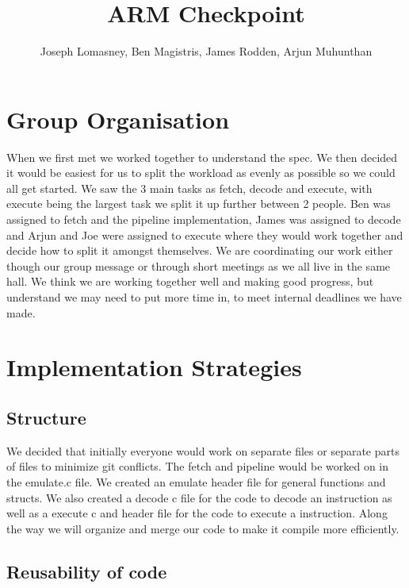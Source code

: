 \documentclass[11pt]{article}
\begin{document}
\title{ARM Checkpoint}
\author{Joseph Lomasney, Ben Magistris, James Rodden, Arjun Muhunthan}

\maketitle

\section{Group Organisation}

When we first met we worked together to understand the spec. We then decided it would be easiest for us to split the workload as evenly as possible so we could all get started. We saw the 3 main tasks as fetch, decode and execute, with execute being the largest task we split it up further between 2 people. Ben was assigned to fetch and the pipeline implementation, James was assigned to decode and Arjun and Joe were assigned to execute where they would work together and decide how to split it amongst themselves. We are coordinating our work either though our group message or through short meetings as we all live in the same hall. We think we are working together well and making good progress, but understand we may need to put more time in, to meet internal deadlines we have made.  

\section{Implementation Strategies}

\subsection{Structure}

We decided that initially everyone would work on separate files or separate parts of files to minimize git conflicts. The fetch and pipeline would be worked on in the emulate.c file. We created an emulate header file for general functions and structs. We also created a decode c file for the code to decode an instruction as well as a execute c and header file for the code to execute a instruction. Along the way we will organize and merge our code to  make it compile more efficiently. 

\subsection{Reusability of code}
\end{document}
